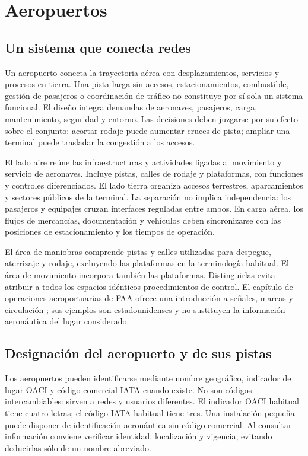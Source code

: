 \chapter{Aeropuertos}\label{ch:13}

\section{Un sistema que conecta redes}
Un aeropuerto conecta la trayectoria aérea con desplazamientos, servicios y procesos en tierra. Una pista larga sin accesos, estacionamientos, combustible, gestión de pasajeros o coordinación de tráfico no constituye por sí sola un sistema funcional. El diseño integra demandas de aeronaves, pasajeros, carga, mantenimiento, seguridad y entorno. Las decisiones deben juzgarse por su efecto sobre el conjunto: acortar rodaje puede aumentar cruces de pista; ampliar una terminal puede trasladar la congestión a los accesos.

El lado aire reúne las infraestructuras y actividades ligadas al movimiento y servicio de aeronaves. Incluye pistas, calles de rodaje y plataformas, con funciones y controles diferenciados. El lado tierra organiza accesos terrestres, aparcamientos y sectores públicos de la terminal. La separación no implica independencia: los pasajeros y equipajes cruzan interfaces reguladas entre ambos. En carga aérea, los flujos de mercancías, documentación y vehículos deben sincronizarse con las posiciones de estacionamiento y los tiempos de operación.

El área de maniobras comprende pistas y calles utilizadas para despegue, aterrizaje y rodaje, excluyendo las plataformas en la terminología habitual. El área de movimiento incorpora también las plataformas. Distinguirlas evita atribuir a todos los espacios idénticos procedimientos de control. El capítulo de operaciones aeroportuarias de FAA ofrece una introducción a señales, marcas y circulación \cite{PHAK}; sus ejemplos son estadounidenses y no sustituyen la información aeronáutica del lugar considerado.

\section{Designación del aeropuerto y de sus pistas}
Los aeropuertos pueden identificarse mediante nombre geográfico, indicador de lugar OACI y código comercial IATA cuando existe. No son códigos intercambiables: sirven a redes y usuarios diferentes. El indicador OACI habitual tiene cuatro letras; el código IATA habitual tiene tres. Una instalación pequeña puede disponer de identificación aeronáutica sin código comercial. Al consultar información conviene verificar identidad, localización y vigencia, evitando deducirlas sólo de un nombre abreviado.


